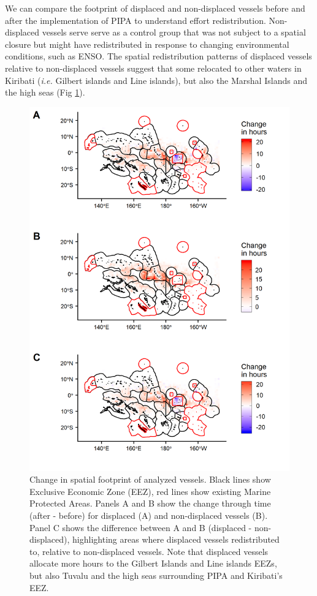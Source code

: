 \documentclass[12pt]{article}
\begin{document}
\clearpage

We can compare the footprint of displaced and non-displaced vessels before and after the implementation of PIPA to understand effort redistribution. Non-displaced vessels serve serve as a control group that was not subject to a spatial closure but might have redistributed in response to changing environmental conditions, such as ENSO. The spatial redistribution patterns of displaced vessels relative to non-displaced vessels suggest that some relocated to other waters in Kiribati (\emph{i.e.} Gilbert islands and Line islands), but also the Marshal Islands and the high seas (Fig \ref{fig:fishing_raster_diff}).

\begin{figure}
\centering
\includegraphics{img/fishing_raster_diff.png}
\caption{\label{fig:fishing_raster_diff}Change in spatial footprint of analyzed vessels. Black lines show Exclusive Economic Zone (EEZ), red lines show existing Marine Protected Areas. Panels A and B show the change through time (after - before) for displaced (A) and non-displaced vessels (B). Panel C shows the difference between A and B (displaced - non-displaced), highlighting areas where displaced vessels redistributed to, relative to non-displaced vessels. Note that displaced vessels allocate more hours to the Gilbert Islands and Line islands EEZs, but also Tuvalu and the high seas surrounding PIPA and Kiribati's EEZ.}
\end{figure}
\end{document}
